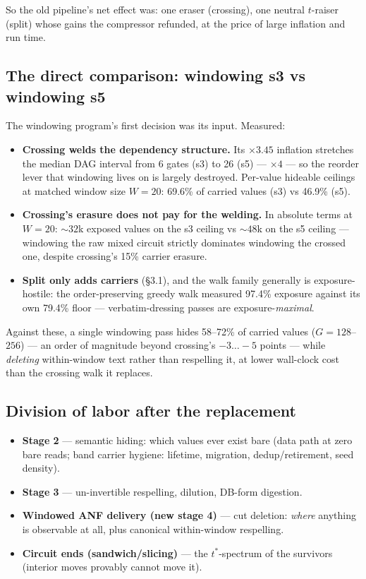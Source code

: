\documentclass[11pt]{article}
\newcommand{\tstar}{t^{*}}
\begin{document}
So the old pipeline's net effect was: one eraser (crossing), one neutral
$t$-raiser (split) whose gains the compressor refunded, at the price of
large inflation and run time.

\subsection{The direct comparison: windowing s3 vs windowing s5}

The windowing program's first decision was its input. Measured:

\begin{itemize}
\item \textbf{Crossing welds the dependency structure.} Its $\times 3.45$
  inflation stretches the median DAG interval from 6 gates (s3) to 26 (s5)
  --- $\times 4$ --- so the reorder lever that windowing lives on is largely
  destroyed. Per-value hideable ceilings at matched window size $W{=}20$:
  69.6\% of carried values (s3) vs 46.9\% (s5).
\item \textbf{Crossing's erasure does not pay for the welding.} In absolute
  terms at $W{=}20$: ${\sim}32$k exposed values on the s3 ceiling vs
  ${\sim}48$k on the s5 ceiling --- windowing the raw mixed circuit strictly
  dominates windowing the crossed one, despite crossing's 15\% carrier
  erasure.
\item \textbf{Split only adds carriers} (\S3.1), and the walk family
  generally is exposure-hostile: the order-preserving greedy walk measured
  97.4\% exposure against its own 79.4\% floor --- verbatim-dressing passes
  are exposure-\emph{maximal}.
\end{itemize}

Against these, a single windowing pass hides 58--72\% of carried values
($G{=}128$--$256$) --- an order of magnitude beyond crossing's
$-3\ldots{-}5$ points --- while \emph{deleting} within-window text rather
than respelling it, at lower wall-clock cost than the crossing walk it
replaces.

\subsection{Division of labor after the replacement}

\begin{itemize}
\item \textbf{Stage 2} --- semantic hiding: which values ever exist bare
  (data path at zero bare reads; band carrier hygiene: lifetime, migration,
  dedup/retirement, seed density).
\item \textbf{Stage 3} --- un-invertible respelling, dilution, DB-form
  digestion.
\item \textbf{Windowed ANF delivery (new stage 4)} --- cut deletion:
  \emph{where} anything is observable at all, plus canonical within-window
  respelling.
\item \textbf{Circuit ends (sandwich/slicing)} --- the $\tstar$-spectrum of
  the survivors (interior moves provably cannot move it).
\end{itemize}
\end{document}

